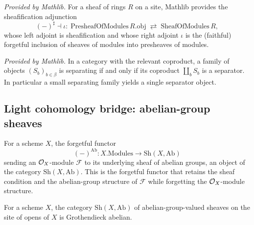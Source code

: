 \begin{lemma}
  \label{mathlib:sheafification_adjunction}
  \mathlibok
  \textit{Provided by Mathlib.}
  For a sheaf of rings \(R\) on a site, Mathlib provides the sheafification adjunction
  \[
    (-)^{\sharp}\dashv \iota:\;\mathrm{PresheafOfModules}\,R.\mathrm{obj}
    \;\rightleftarrows\;\mathrm{SheafOfModules}\,R ,
  \]
  whose left adjoint is sheafification and whose right adjoint \(\iota\) is the
  (faithful) forgetful inclusion of sheaves of modules into presheaves of modules.
\end{lemma}

\begin{lemma}
  \label{mathlib:isSeparator_sigma}
  \mathlibok
  \textit{Provided by Mathlib.}
  In a category with the relevant coproduct, a family of objects
  \((S_b)_{b\in\beta}\) is separating if and only if its coproduct
  \(\coprod_{b}S_b\) is a separator.  In particular a small separating family
  yields a single separator object.
\end{lemma}

\subsection{Light cohomology bridge: abelian-group sheaves}

\begin{definition}
  \label{found:modules_to_absheaf}
  For a scheme \(X\), the forgetful functor
  \[
    (-)^{\mathrm{Ab}}:X.\mathrm{Modules}\to\mathrm{Sh}(X,\mathrm{Ab})
  \]
  sending an \(\mathcal{O}_X\)-module \(\mathcal F\) to its underlying sheaf of abelian
  groups, an object of the category \(\mathrm{Sh}(X,\mathrm{Ab})\).  This is the
  forgetful functor that retains the sheaf condition and the abelian-group
  structure of \(\mathcal F\) while forgetting the \(\mathcal{O}_X\)-module structure.
\end{definition}

\begin{lemma}
  \label{found:absheaf_groth_abelian}
  For a scheme \(X\), the category \(\mathrm{Sh}(X,\mathrm{Ab})\) of
  abelian-group-valued sheaves on the site of opens of \(X\) is Grothendieck
  abelian.
\end{lemma}

